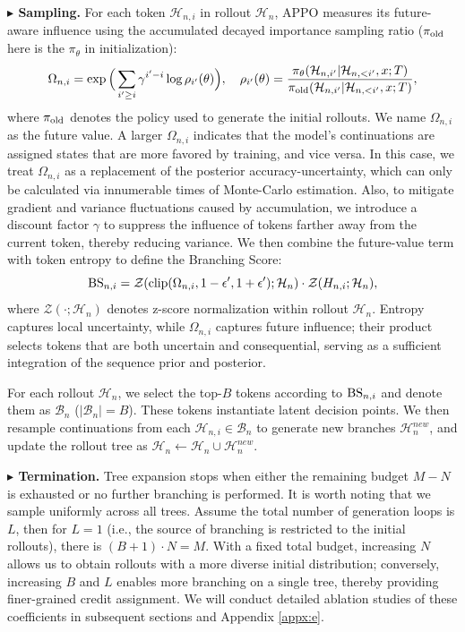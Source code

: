 \documentclass{llmxive}
\begin{document}
\textbf{$\blacktriangleright$ Sampling.}
For each token $\mathcal{H}_{n,i}$ in rollout $\mathcal{H}_n$, APPO measures its future-aware influence using the accumulated decayed importance sampling ratio ($\pi_{\rm old}$ here is the $\pi_{\theta}$ in initialization):
\begin{equation}
    \Omega_{n,i}=\exp\Big(\sum_{i'\ge i}\gamma^{i'-i}\log \rho_{i'}(\theta)\Big), \quad 
    \rho_{i'}(\theta)=\frac{\pi_\theta(\mathcal{H}_{n,i'}|\mathcal{H}_{n,<i'},x;T)}{\pi_{\rm old}(\mathcal{H}_{n,i'}|\mathcal{H}_{n,<i'},x;T)},
\end{equation}
where $\pi_{\rm old}$ denotes the policy used to generate the initial rollouts. We name $\Omega_{n,i}$ as the future value. A larger $\Omega_{n,i}$ indicates that the model’s continuations are assigned states that are more favored by training, and vice versa. In this case, we treat $\Omega_{n,i}$ as a replacement of the posterior accuracy-uncertainty, which can only be calculated via innumerable times of Monte-Carlo estimation. Also, to mitigate gradient and variance fluctuations caused by accumulation, we introduce a discount factor $\gamma$ to suppress the influence of tokens farther away from the current token, thereby reducing variance. We then combine the future-value term with token entropy to define the Branching Score:
\begin{equation}
    {\rm BS}_{n,i}= \mathcal{Z}({\rm clip}(\Omega_{n,i},1-\epsilon',1+\epsilon');\mathcal{H}_{n}) \cdot \mathcal{Z}(H_{n,i};\mathcal{H}_{n}),
\end{equation}
where $\mathcal{Z}(\cdot;\mathcal{H}_n)$ denotes z-score normalization within rollout $\mathcal{H}_n$. Entropy captures local uncertainty, while $\Omega_{n,i}$ captures future influence; their product selects tokens that are both uncertain and consequential, serving as a sufficient integration of the sequence prior and posterior.

For each rollout $\mathcal{H}_n$, we select the top-$B$ tokens according to ${\rm BS}_{n,i}$ and denote them as $\mathcal{B}_n$ ($|\mathcal{B}_n|=B$). These tokens instantiate latent decision points. We then resample continuations from each $\mathcal{H}_{n,i}\in\mathcal{B}_n$ to generate new branches $\mathcal{H}_n^{new}$, and update the rollout tree as $\mathcal{H}_n \leftarrow \mathcal{H}_n \cup \mathcal{H}_n^{new}$.

\textbf{$\blacktriangleright$ Termination.}
Tree expansion stops when either the remaining budget $M-N$ is exhausted or no further branching is performed. It is worth noting that we sample uniformly across all trees. Assume the total number of generation loops is $L$, then for $L=1$ (i.e., the source of branching is restricted to the initial rollouts), there is $(B+1)\cdot N=M$. With a fixed total budget, increasing $N$ allows us to obtain rollouts with a more diverse initial distribution; conversely, increasing $B$ and $L$ enables more branching on a single tree, thereby providing finer-grained credit assignment. We will conduct detailed ablation studies of these coefficients in subsequent sections and Appendix \ref{appx:e}.
\end{document}
